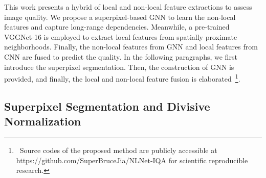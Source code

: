 This work presents a hybrid of local and non-local feature extractions to assess image quality. We propose a superpixel-based GNN to learn the non-local features and capture long-range dependencies. Meanwhile, a pre-trained VGGNet-16 is employed to extract local features from spatially proximate neighborhoods. Finally, the non-local features from GNN and local features from CNN are fused to predict the quality. In the following paragraphs, we first introduce the superpixel segmentation. Then, the construction of GNN is provided, and finally, the local and non-local feature fusion is elaborated~\footnote{~Source codes of the proposed method are publicly accessible at https://github.com/SuperBruceJia/NLNet-IQA for scientific reproducible research.}.

	\subsection{Superpixel Segmentation and Divisive Normalization}
